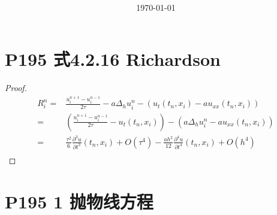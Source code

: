 \documentclass{article}%
\title{\heiti \myArticleName \\ [2ex] \begin{large} \myHomeworkNumber \end{large}}
\author{\kaishu \myName \myNumber}
\date{\today}
\begin{document}
\maketitle


\section{P195 式4.2.16 Richardson}

\begin{proof}
	\begin{align*}
		R^n_i = & \frac{u_i^{n+1}-u_i^{n-1}}{2 \tau }- a \Delta _h u_i^n - \left ( u_t(t_n,x_i)-au_{xx}(t_n,x_i) \right )  \\
			= & \left (\frac{u_i^{n+1}-u_i^{n-1}}{2 \tau } - u_t(t_n,x_i)  \right )  - \left (a \Delta _h u_i^n -au_{xx}(t_n,x_i)  \right ) \\
			= & \frac{\tau^2}{6}\frac{\partial ^3 u}{\partial t^3}(t_n,x_i)+ O(\tau^4)-\frac{ah^2}{12}\frac{\partial ^4 u}{\partial t^4}(t_n,x_i)+O(h^4) \\
	\end{align*}
\end{proof}

\section{P195 1 抛物线方程}
\end{document}
